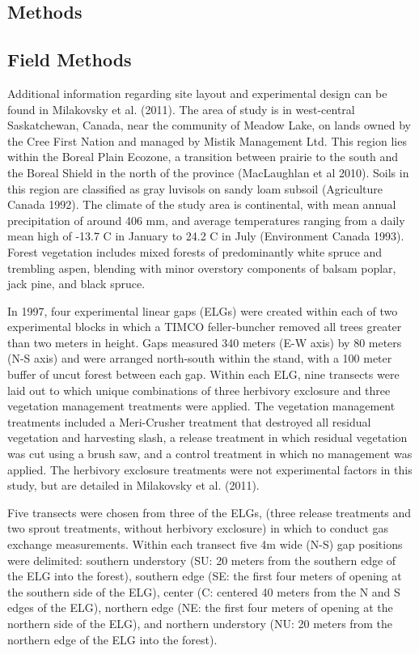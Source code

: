 \documentclass{article}\usepackage[]{graphicx}\usepackage[]{color}
\begin{document}
\begin{multicols}{2}
\section{Methods}

\subsection{Field Methods}
Additional information regarding site layout and experimental design can be found in Milakovsky et al. (2011). The area of study is in west-central Saskatchewan, Canada, near the community of Meadow Lake, on lands owned by the Cree First Nation and managed by Mistik Management Ltd. This region lies within the Boreal Plain Ecozone, a transition between prairie to the south and the Boreal Shield in the north of the province (MacLaughlan et al 2010). Soils in this region are classified as gray luvisols on sandy loam subsoil (Agriculture Canada 1992). The climate of the study area is continental, with mean annual precipitation of around 406 mm, and average temperatures ranging from a daily mean high of -13.7 C in January to 24.2 C in July (Environment Canada 1993). Forest vegetation includes mixed forests of predominantly white spruce and trembling aspen, blending with minor overstory components of balsam poplar, jack pine, and black spruce. 

In 1997, four experimental linear gaps (ELGs) were created within each of two experimental blocks in which a TIMCO feller-buncher removed all trees greater than two meters in height. Gaps measured 340 meters (E-W axis) by 80 meters (N-S axis) and were arranged north-south within the stand, with a 100 meter buffer of uncut forest between each gap. Within each ELG, nine transects were laid out to which unique combinations of three herbivory exclosure and three vegetation management treatments were applied. The vegetation management treatments included a Meri-Crusher treatment that destroyed all residual vegetation and harvesting slash, a release treatment in which residual vegetation was cut using a brush saw, and a control treatment in which no management was applied. The herbivory exclosure treatments were not experimental factors in this study, but are detailed in Milakovsky et al. (2011). 

Five transects were chosen from three of the ELGs, (three release treatments and two sprout treatments, without herbivory exclosure) in which to conduct gas exchange measurements. Within each transect five 4m wide (N-S) gap positions were delimited: southern understory (SU: 20 meters from the southern edge of the ELG into the forest), southern edge (SE: the first four meters of opening at the southern side of the ELG), center (C: centered 40 meters from the N and S edges of the ELG), northern edge (NE: the first four meters of opening at the northern side of the ELG), and northern understory (NU: 20 meters from the northern edge of the ELG into the forest). 


\end{multicols}
\end{document}
